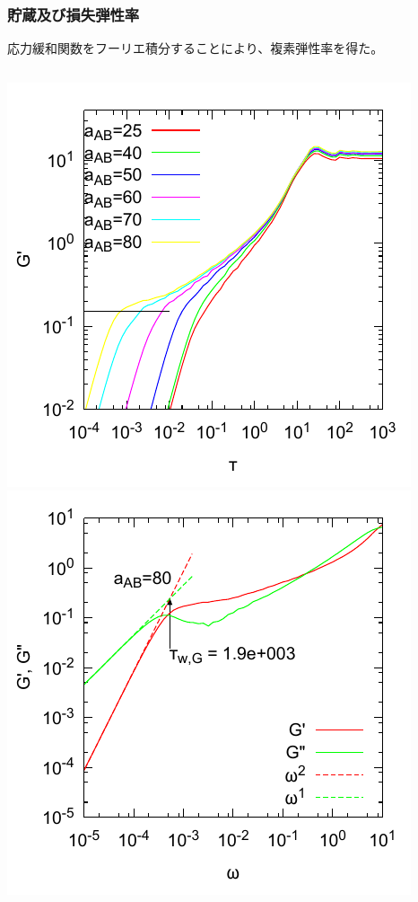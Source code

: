 \documentclass[12pt, dvipdfmx]{beamer}
\begin{document}
\begin{frame}
\frametitle{貯蔵及び損失弾性率}

応力緩和関数をフーリエ積分することにより、複素弾性率を得た。

	\begin{columns}[T, totalwidth=0.96\linewidth]
		\includegraphics[width=\columnwidth]{./fig/gw_all.pdf}		
		\includegraphics[width=\columnwidth]{./fig/AB80/gw_80.pdf}
	\end{columns}
\end{frame}
\end{document}
